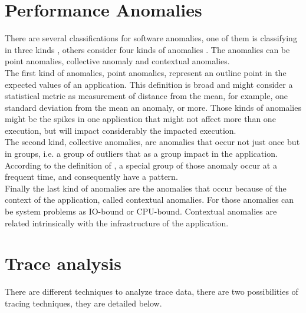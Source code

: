 \section{Performance Anomalies}
There are several classifications for software anomalies, one of them is classifying in three kinds \cite{Chandola2009ADS15418801541882}, others consider four kinds of anomalies \cite{Ibidunmoye2015PAD28086872791120}. The anomalies can be point anomalies, collective anomaly and contextual anomalies.\\
The first kind of anomalies, point anomalies, represent an outline point in the expected values of an application. This definition is broad and might consider a statistical metric as measurement of distance from the mean, for example,  one standard deviation from the mean an anomaly, or more. Those kinds of anomalies might be the spikes in one application that might not affect more than one execution, but will impact considerably the impacted execution.\\
The second kind, collective anomalies, are anomalies that occur not just  once but in groups, i.e. a group of outliers that as a group impact in the application. According to the definition of \cite{Ibidunmoye2015PAD28086872791120}, a special group of those anomaly occur at a frequent time, and consequently have a pattern. \\
Finally the last kind of anomalies are the anomalies that occur because of the context of the application, called contextual anomalies. For those anomalies can be system problems as  IO-bound or CPU-bound. Contextual anomalies are related intrinsically with the infrastructure of the application.
\section{Trace analysis}
There are different techniques to analyze trace data, there are two possibilities of tracing techniques, they are detailed below.
